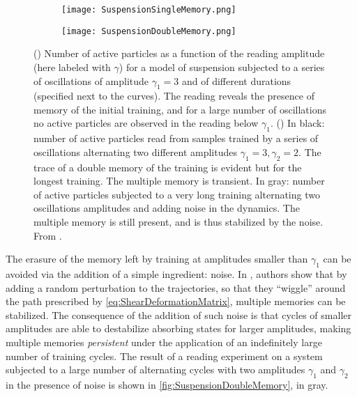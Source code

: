 \begin{figure} 
	\centering
	\begin{subfigure}[b]{0.45\textwidth}
		\centering
		\texttt{[image: SuspensionSingleMemory.png]}
		\caption{\label{fig:SuspensionSingleMemory}}
	\end{subfigure}
	\centering
	\begin{subfigure}[b]{0.45\textwidth}
		\centering
		\texttt{[image: SuspensionDoubleMemory.png]}
		\caption{\label{fig:SuspensionDoubleMemory}}
	\end{subfigure} 
\caption{() Number of active particles as a function of the reading amplitude (here labeled with $\gamma$) for a model of suspension subjected to a series of oscillations of amplitude $\gamma_{1}=3$ and of different durations (specified next to the curves). The reading reveals the presence of memory of the initial training, and for a large number of oscillations no active particles are observed in the reading below $\gamma_{1}$. () In black: number of active particles read from samples trained by a series of oscillations alternating two different amplitudes $\gamma_{1}=3, \gamma_{2}=2$. The trace of a double memory of the training is evident but for the longest training. The multiple memory is transient. In gray: number of active particles subjected to a very long training alternating two oscillations amplitudes and adding noise in the dynamics. The multiple memory is still present, and is thus stabilized by the noise. From \cite{keim2011generic}. \label{fig:SuspensionMemory}}
\end{figure}

The erasure of the memory left by training at amplitudes smaller than $\gamma_{1}$ can be avoided via the addition of a simple ingredient: noise. In \cite{keim2011generic}, authors show that by adding a random perturbation to the trajectories, so that they ``wiggle'' around the path prescribed by \autoref{eq:ShearDeformationMatrix}, multiple memories can be stabilized. The consequence of the addition of such noise is that cycles of smaller amplitudes are able to destabilize absorbing states for larger amplitudes, making multiple memories \emph{persistent} under the application of an indefinitely large number of training cycles. The result of a reading experiment on a system subjected to a large number of alternating cycles with two amplitudes $\gamma_{1}$ and $\gamma_{2}$ in the presence of noise is shown in \autoref{fig:SuspensionDoubleMemory}, in gray.

